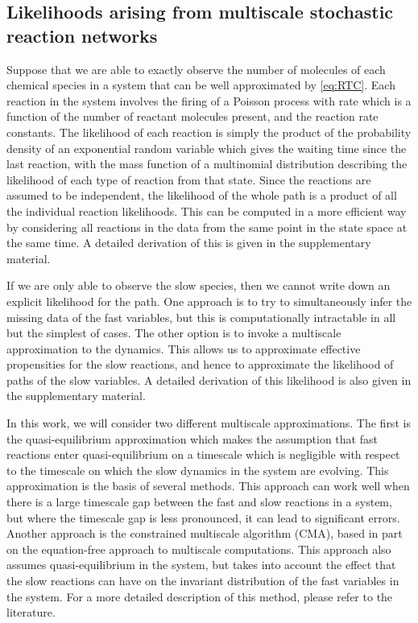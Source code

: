 \documentclass[final]{siamltex}
\newcommand{\edit}[1]{#1}
\begin{document}
\subsection{Likelihoods arising from multiscale stochastic reaction networks}
Suppose that we are able to exactly observe the number of molecules of
each chemical species in a system that can be well approximated by
\eqref{eq:RTC}. \edit{Each reaction in the system involves the firing
  of a Poisson process with rate which is a function of the number of
  reactant molecules present, and the reaction rate constants. The likelihood
  of each reaction is simply the product of the probability density of
  an exponential random
  variable which gives the waiting time since the last reaction, with
  the mass function of a
  multinomial distribution describing the likelihood of each type of
  reaction from that state. Since the
  reactions are assumed to be independent, the likelihood of the whole
  path is a product of all the individual reaction likelihoods. This
  can be computed in a more efficient way by considering all reactions
  in the data from the same point in the state space at the same
  time. A detailed derivation of this is given in the
  supplementary material.

If we are only able to observe the slow species, then we cannot write
down an explicit likelihood for the path. One approach is to try to
simultaneously infer the
missing data of the fast variables, but this is computationally
intractable in all but the simplest of cases. The other option is to
invoke a multiscale approximation to the dynamics. This allows us to
approximate effective propensities for the slow reactions, and hence
to approximate the likelihood of paths of the slow variables. A
detailed derivation of this likelihood is also given in the
supplementary material.

In this work, we will consider two different multiscale
approximations. The first is the quasi-equilibrium approximation
which makes the assumption that fast reactions
enter quasi-equilibrium on a timescale which is negligible with
respect to the timescale on which the slow dynamics in the system are
evolving. This approximation is the basis of several
methods\cite{weinan2007nested,cao2005slow}. This approach can work well when there is a large timescale gap
between the fast and slow reactions in a system, but where the
timescale gap is less pronounced, it can lead to significant
errors\cite{cotter2016error}. Another approach is the
constrained multiscale algorithm (CMA)\cite{cotter2011constrained,cotter2016constrained}, based in part on the
equation-free approach to multiscale computations\cite{kevrekidis2003equation,erban2006gene}. This approach also assumes quasi-equilibrium in the
system, but takes into account the effect that the slow reactions can
have on the invariant distribution of the fast variables in the
system. For a more detailed description of this method, please refer
to the literature\cite{cotter2016constrained}.


}
\end{document}
